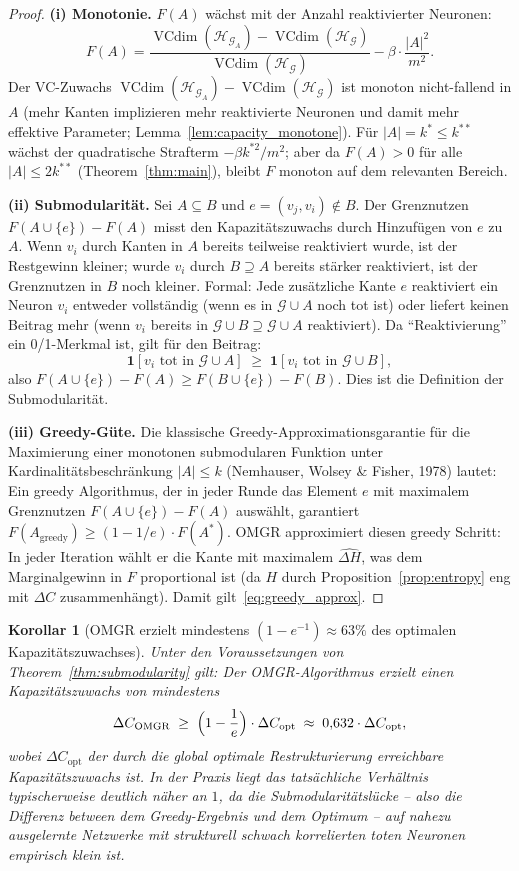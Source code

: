 \documentclass[12pt, a4paper, openany]{report}
\newtheorem{corollary}[theorem]{Korollar}
\newcommand{\calG}{\mathcal{G}}
\newcommand{\calH}{\mathcal{H}}
\DeclareMathOperator{\VC}{VCdim}
\begin{document}
\begin{proof}
\textbf{(i) Monotonie.}
$F(A)$ wächst mit der Anzahl reaktivierter Neuronen:
\[
  F(A) = \frac{\VC(\calH_{\calG_A}) - \VC(\calH_\calG)}{\VC(\calH_\calG)} - \beta\cdot\frac{|A|^2}{m^2}.
\]
Der VC-Zuwachs $\VC(\calH_{\calG_A}) - \VC(\calH_\calG)$ ist monoton
nicht-fallend in $A$ (mehr Kanten implizieren mehr reaktivierte Neuronen
und damit mehr effektive Parameter; Lemma~\ref{lem:capacity_monotone}).
Für $|A| = k^* \leq k^{**}$ wächst der quadratische Strafterm $-\beta k^{*2}/m^2$;
aber da $F(A) > 0$ für alle $|A| \leq 2k^{**}$ (Theorem~\ref{thm:main}),
bleibt $F$ monoton auf dem relevanten Bereich.

\textbf{(ii) Submodularität.}
Sei $A \subseteq B$ und $e = (v_j, v_i) \notin B$.  Der Grenznutzen
$F(A \cup \{e\}) - F(A)$ misst den Kapazitätszuwachs durch Hinzufügen
von $e$ zu $A$.  Wenn $v_i$ durch Kanten in $A$ bereits teilweise
reaktiviert wurde, ist der Restgewinn kleiner; wurde $v_i$ durch $B \supseteq A$
bereits stärker reaktiviert, ist der Grenznutzen in $B$ noch kleiner.
Formal: Jede zusätzliche Kante $e$ reaktiviert ein Neuron $v_i$ entweder
vollständig (wenn es in $\calG \cup A$ noch tot ist) oder liefert keinen
Beitrag mehr (wenn $v_i$ bereits in $\calG \cup B \supseteq \calG \cup A$ reaktiviert).
Da ``Reaktivierung'' ein 0/1-Merkmal ist, gilt für den Beitrag:
\[
  \mathbf{1}[v_i \text{ tot in } \calG \cup A]
  \;\geq\;
  \mathbf{1}[v_i \text{ tot in } \calG \cup B],
\]
also $F(A \cup \{e\}) - F(A) \geq F(B \cup \{e\}) - F(B)$. Dies ist die
Definition der Submodularität.

\textbf{(iii) Greedy-Güte.}
Die klassische Greedy-Approximationsgarantie für die Maximierung einer
monotonen submodularen Funktion unter Kardinalitätsbeschränkung $|A| \leq k$
(Nemhauser, Wolsey \& Fisher, 1978) lautet:
Ein greedy Algorithmus, der in jeder Runde das Element $e$ mit maximalem
Grenznutzen $F(A \cup \{e\}) - F(A)$ auswählt, garantiert
$F(A_{\mathrm{greedy}}) \geq (1 - 1/e) \cdot F(A^*)$.
OMGR approximiert diesen greedy Schritt:
In jeder Iteration wählt er die Kante mit maximalem $\widehat{\Delta H}$,
was dem Marginalgewinn in $F$ proportional ist (da $H$ durch Proposition~\ref{prop:entropy}
eng mit $\Delta C$ zusammenhängt).  Damit gilt~\eqref{eq:greedy_approx}.
\end{proof}

\begin{corollary}[OMGR erzielt mindestens $(1-e^{-1}) \approx 63\%$ des optimalen Kapazitätszuwachses]
\label{cor:omgr_approx}
Unter den Voraussetzungen von Theorem~\ref{thm:submodularity} gilt:
Der OMGR-Algorithmus erzielt einen Kapazitätszuwachs von mindestens
\[
  \Delta C_{\mathrm{OMGR}}
  \;\geq\;
  \Bigl(1 - \frac{1}{e}\Bigr) \cdot \Delta C_{\mathrm{opt}}
  \;\approx\; 0{,}632 \cdot \Delta C_{\mathrm{opt}},
\]
wobei $\Delta C_{\mathrm{opt}}$ der durch die global optimale Restrukturierung
erreichbare Kapazitätszuwachs ist.  In der Praxis liegt das tatsächliche
Verhältnis typischerweise deutlich näher an $1$, da die Submodularitätslücke
-- also die Differenz between dem Greedy-Ergebnis und dem Optimum -- auf
nahezu ausgelernte Netzwerke mit strukturell schwach korrelierten toten
Neuronen empirisch klein ist.
\end{corollary}
\end{document}
